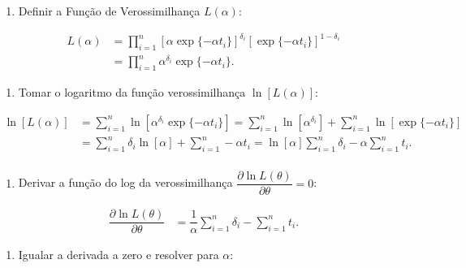 \documentclass[
  12pt,
  letterpaper,
  DIV=11,
  numbers=noendperiod]{scrreprt}
\providecommand{\tightlist}{%
  \setlength{\itemsep}{0pt}\setlength{\parskip}{0pt}}\usepackage{longtable,booktabs,array}
\begin{document}
\begin{enumerate}
\def\labelenumi{\arabic{enumi}.}
\tightlist
\item
  Definir a Função de Verossimilhança \(L(\alpha)\):
\end{enumerate}

\begin{align*}
    L (\alpha) & = \prod_{i = 1}^{n} [\alpha \exp \{-\alpha t_{i}\}]^{\delta_{i}} [\exp \{-\alpha t_{i}\}]^{1 - \delta_{i}} \\
               & = \prod_{i = 1}^{n} \alpha^{\delta_{i}} \exp \{ - \alpha t_{i} \}.
\end{align*}

\begin{enumerate}
\def\labelenumi{\arabic{enumi}.}
\setcounter{enumi}{1}
\tightlist
\item
  Tomar o logaritmo da função verossimilhança \(\ln[L(\alpha)]\):
\end{enumerate}

\begin{align*}
    \ln[L (\alpha)] & = \sum_{i = 1}^{n} \ln \left[ \alpha^{\delta_{i}} \exp \{ - \alpha t_{i} \} \right] = \sum_{i = 1}^{n} \ln \left[ \alpha^{\delta_{i}} \right] + \sum_{i = 1}^{n} \ln \left[ \exp \{ - \alpha t_{i} \} \right] \\
                   & = \sum_{i = 1}^{n} \delta_{i} \ln[\alpha] + \sum_{i = 1}^{n} - \alpha t_{i} =  \ln[\alpha] \sum_{i = 1}^{n} \delta_{i} - \alpha \sum_{i = 1}^{n} t_{i}. \\
\end{align*}

\begin{enumerate}
\def\labelenumi{\arabic{enumi}.}
\setcounter{enumi}{2}
\tightlist
\item
  Derivar a função do log da verossimilhança
  \(\dfrac{\partial \ln L (\theta)}{\partial \theta} = 0\):
\end{enumerate}

\begin{align*}
    \dfrac{\partial \ln L (\theta)}{\partial \theta}  & = \dfrac{1}{\alpha} \sum_{i = 1}^{n} \delta_{i} - \sum_{i = 1}^{n} t_{i}.
\end{align*}

\begin{enumerate}
\def\labelenumi{\arabic{enumi}.}
\setcounter{enumi}{3}
\tightlist
\item
  Igualar a derivada a zero e resolver para \(\alpha\):
\end{enumerate}
\end{document}
